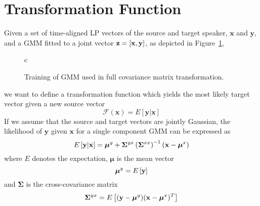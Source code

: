 \section{Transformation Function} %
\label{sec:transformation_function}
Given a set of time-aligned LP vectors of the source and target speaker, $\mathbf{x}$ and $\mathbf{y}$, and a GMM fitted to a joint vector $\mathbf{z}=\left[\mathbf{x},\mathbf{y}\right]$, as depicted in Figure~\ref{fig:VC_training_full},
\begin{figure}[htbp]
	\centering
	\begin{tabular}[h]{c}
	\end{tabular}
	\caption{Training of GMM used in full covariance matrix transformation.}
	\label{fig:VC_training_full}
\end{figure}
we want to define a transformation function which yields the most likely target vector given a new source vector
\newcommand{\fff}{\mathcal F}
\begin{equation}
	\fff(\mathbf{x}) = E[\mathbf{y}\vert \mathbf{x}]
\end{equation}
If we assume that the source and target vectors are jointly Gaussian, the likelihood of $\mathbf{y}$ given $\mathbf{x}$ for a single component GMM can be expressed as \cite{kay93}
\begin{equation}
	E \left[\mathbf{y}\vert \mathbf{x}\right] = \boldsymbol{\mu}^y + \mathbf{\Sigma}^{yx} \left(\mathbf{\Sigma}^{xx}\right)^{-1} (\mathbf{x}-\boldsymbol{\mu}^x)
\end{equation}
where $E$ denotes the expectation, $\boldsymbol{\mu}$ is the mean vector
\begin{equation}
	\boldsymbol{\mu}^y = E\left[\mathbf{y}\right]
\end{equation}
and $\mathbf{\Sigma}$ is the cross-covariance matrix
\begin{equation}
	\mathbf{\Sigma}^{yx} = E \left[(\mathbf{y}-\boldsymbol{\mu}^y)(\mathbf{x}-\boldsymbol{\mu}^x)^T\right]
\end{equation}

